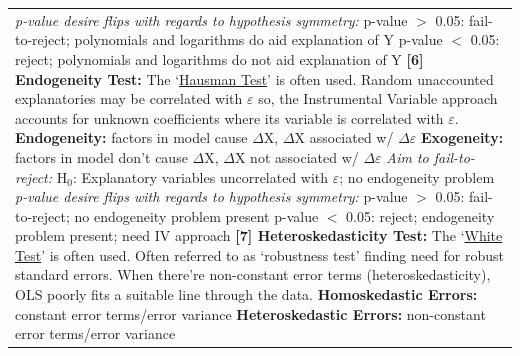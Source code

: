 \documentclass[11pt, english]{article}
\begin{document}
\begin{center}
\begin{longtable}{p{14cm}}
                \textit{p-value desire flips with regards to hypothesis symmetry:}\newline
                p-value $>$ 0.05: fail-to-reject; polynomials and logarithms do aid explanation of Y\newline
                p-value $<$ 0.05: reject; polynomials and logarithms do not aid explanation of Y\newline\newline
                \textbf{[6] Endogeneity Test: }The `\underline{Hausman Test}' is often used. Random unaccounted explanatories may be correlated with $\varepsilon$ so, the Instrumental Variable approach accounts for unknown coefficients where its variable is correlated with $\varepsilon$.\newline\newline
                \textbf{Endogeneity: }factors in model cause $\Delta$X, $\Delta$X associated w/ $\Delta\varepsilon$\newline
                \textbf{Exogeneity: }factors in model don't cause $\Delta$X, $\Delta$X not associated w/ $\Delta\varepsilon$\newline\newline 
                \textit{Aim to fail-to-reject:}\newline
                        H$_0$: Explanatory variables uncorrelated with $\varepsilon$; no endogeneity problem\newline\newline
		\textit{p-value desire flips with regards to hypothesis symmetry:}\newline
                p-value $>$ 0.05: fail-to-reject; no endogeneity problem present\newline
                p-value $<$ 0.05: reject; endogeneity problem present; need IV approach\newline\newline
                \textbf{[7] Heteroskedasticity Test: }The `\underline{White Test}' is often used. Often referred to as `robustness test' finding need for robust standard errors. When there’re non-constant error terms (heteroskedasticity), OLS poorly fits a suitable line through the data.\newline\newline
                \textbf{Homoskedastic Errors: }constant error terms/error variance\newline
                \textbf{Heteroskedastic Errors: }non-constant error terms/error variance\newline\newline

\end{longtable}
\end{center}
\end{document}
